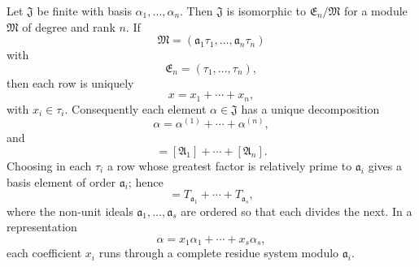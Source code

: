 \documentclass[11pt]{article}
\begin{document}
Let $\mathfrak J$ be finite with basis $\alpha_1,
\ldots,
\alpha_n$. Then $\mathfrak J$ is isomorphic to $\mathfrak E_n/\mathfrak M$ for a module $\mathfrak M$ of degree and rank $n$. If
\begin{equation}
  \mathfrak M=(\mathfrak a_1\tau_1,
  \ldots,
  \mathfrak a_n\tau_n)
\tag{106}
\end{equation}
with
\begin{equation}
  \mathfrak E_n=(\tau_1,
  \ldots,
  \tau_n),
\tag{107}
\end{equation}
then each row is uniquely
\begin{equation}
  x=x_1+\cdots+x_n,
\tag{108}
\end{equation}
with $x_i\in\tau_i$. Consequently each element $\alpha\in\mathfrak J$ has a unique decomposition
\begin{equation}
  \alpha=\alpha^{(1)}+\cdots+\alpha^{(n)},
\tag{109}
\end{equation}
and
\begin{equation}
  [\mathfrak J]=[\mathfrak A_1]+\cdots+[\mathfrak A_n].
\tag{110}
\end{equation}
Choosing in each $\tau_i$ a row whose greatest factor is relatively prime to $\mathfrak a_i$ gives a basis element of order $\mathfrak a_i$; hence
\begin{equation}
  [\mathfrak J]=T_{\mathfrak a_1}+\cdots+T_{\mathfrak a_s},
\tag{111}
\end{equation}
where the non-unit ideals $\mathfrak a_1,
\ldots,
\mathfrak a_s$ are ordered so that each divides the next. In a representation
\begin{equation}
  \alpha=x_1\alpha_1+\cdots+x_s\alpha_s,
\tag{112}
\end{equation}
each coefficient $x_i$ runs through a complete residue system modulo $\mathfrak a_i$.
\end{document}
